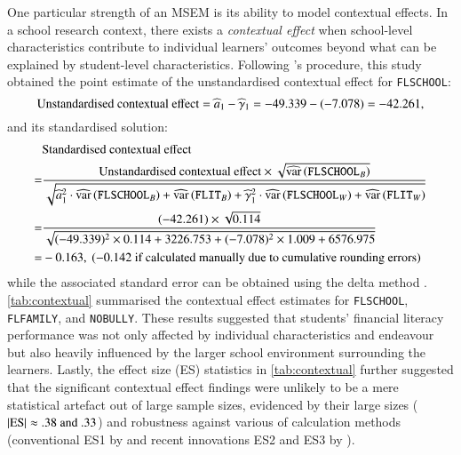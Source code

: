 One particular strength of an MSEM is its ability to model contextual effects. In a school research context, there exists a \emph{contextual effect} when school-level characteristics contribute to individual learners' outcomes beyond what can be explained by student-level characteristics. Following \citet{marsh:2009}'s procedure, this study obtained the point estimate of the unstandardised contextual effect for \texttt{FLSCHOOL}:
\begin{equation}
    \text{Unstandardised contextual effect} = \widehat{a}_1 - \widehat{\gamma}_1 = -49.339 - (-7.078) = -42.261,
\end{equation}
\noindent and its standardised solution:
\begin{equation}
    \begin{aligned}
        &\text{Standardised contextual effect}\\
        =& \frac{\text{Unstandardised contextual effect} \times \sqrt{\widehat{\text{var}}\left(\texttt{FLSCHOOL}_B\right)}}{\sqrt{\widehat{a}_1^2 \cdot \widehat{\text{var}}\left(\texttt{FLSCHOOL}_B\right) + \widehat{\text{var}}\left(\texttt{FLIT}_B\right) + \widehat{\gamma}_1^2 \cdot \widehat{\text{var}}\left(\texttt{FLSCHOOL}_W\right) + \widehat{\text{var}}\left(\texttt{FLIT}_W\right)}}\\
        =& \frac{(-42.261) \times \sqrt{0.114}}{\sqrt{(-49.339)^2 \times 0.114 + 3226.753 + (-7.078)^2 \times 1.009 + 6576.975}}\\
        =& -0.163,\ \text{($-0.142$ if calculated manually due to cumulative rounding errors)}
    \end{aligned}
\end{equation}
\noindent while the associated standard error can be obtained using the delta method \citep{raykov:2004}. \cref{tab:contextual} summarised the contextual effect estimates for \texttt{FLSCHOOL}, \texttt{FLFAMILY}, and \texttt{NOBULLY}. These results suggested that students' financial literacy performance was not only affected by individual characteristics and endeavour but also heavily influenced by the larger school environment surrounding the learners. Lastly, the effect size (ES) statistics in \cref{tab:contextual} further suggested that the significant contextual effect findings were unlikely to be a mere statistical artefact out of large sample sizes, evidenced by their large sizes ($\abs{\text{ES}} \approx .38\ \text{and}\ .33$) and robustness against various of calculation methods (conventional ES1 by \citet{tymms:2004} and recent innovations ES2 and ES3 by \citet{marsh:2009}).

%
